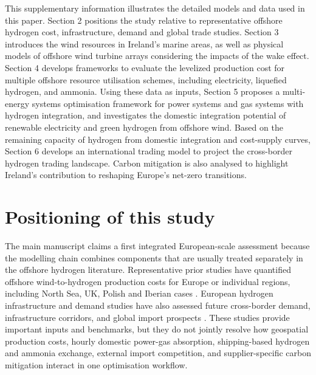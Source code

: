 \documentclass[sn-mathphys,Numbered]{sn-jnl}%
\theoremstyle{thmstyleone}%
\theoremstyle{thmstyletwo}%
\theoremstyle{thmstylethree}%
\begin{document}
This supplementary information illustrates the detailed models and data used in this paper.
Section 2 positions the study relative to representative offshore hydrogen cost, infrastructure, demand and global trade studies.
Section 3 introduces the wind resources in Ireland's marine areas, as well as physical models of offshore wind turbine arrays considering the impacts of the wake effect.
Section 4 develops frameworks to evaluate the levelized production cost for multiple offshore resource utilisation schemes, including electricity, liquefied hydrogen, and ammonia.
Using these data as inputs, Section 5 proposes a multi-energy systems optimisation framework for power systems and gas systems with hydrogen integration, and investigates the domestic integration potential of renewable electricity and green hydrogen from offshore wind.
Based on the remaining capacity of hydrogen from domestic integration and cost-supply curves, Section 6 develops an international trading model to project the cross-border hydrogen trading landscape. Carbon mitigation is also analysed to highlight Ireland's contribution to reshaping Europe's net-zero transitions.

\section{Positioning of this study}

The main manuscript claims a first integrated European-scale assessment because the modelling chain combines components that are usually treated separately in the offshore hydrogen literature. Representative prior studies have quantified offshore wind-to-hydrogen production costs for Europe or individual regions, including North Sea, UK, Polish and Iberian cases \cite{rogeau2023techno, giampieri2024techno, komorowska2023evaluating, gonzalez2024techno, calado2024assessment}. European hydrogen infrastructure and demand studies have also assessed future cross-border demand, infrastructure corridors, and global import prospects \cite{EuropeanHydrogenBackbone, Analysingfuturedemand, IEAGlobalHydrogenReview2025, IEAGlobalHydrogenReviewTrade2025, IRENAGlobalHydrogenTradeOutlook2022}. These studies provide important inputs and benchmarks, but they do not jointly resolve how geospatial production costs, hourly domestic power-gas absorption, shipping-based hydrogen and ammonia exchange, external import competition, and supplier-specific carbon mitigation interact in one optimisation workflow.
\end{document}
